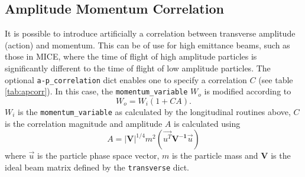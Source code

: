 \subsection{Amplitude Momentum Correlation}
It is possible to introduce artificially a correlation between transverse amplitude (action) and momentum. This can be of use for high emittance beams, such as those in MICE, where the time of flight of high amplitude particles is significantly different to the time of flight of low amplitude particles. The optional \verb|a-p_correlation| dict enables one to specify a correlation $C$ (see table \ref{tab:apcorr}). In this case, the \verb|momentum_variable| $W_o$ is modified according to
\begin{equation}
W_o = W_i(1+CA).
\end{equation}
$W_i$ is the \verb|momentum_variable| as calculated by the longitudinal routines above, $C$ is the correlation magnitude and amplitude $A$ is calculated using
\begin{equation}
A = \mathbf{|V|}^{1/4}m^2(\vec{u^T} \mathbf{V^{-1}} \vec{u}) 
\end{equation}
where $\vec{u}$ is the particle phase space vector, $m$ is the particle mass and $\mathbf{V}$ is the ideal beam matrix defined by the \verb|transverse| dict.

